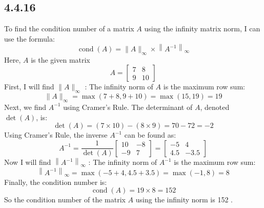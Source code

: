 \documentclass[manuscript,screen,review]{acmart}
\begin{document}
\subsection*{4.4.16}
To find the condition number of a matrix $A$ using the infinity matrix norm, I can use the formula:
$$
\operatorname{cond}(A)=\|A\|_{\infty} \times\left\|A^{-1}\right\|_{\infty}
$$
Here, $A$ is the given matrix
$$
A=\left[\begin{array}{cc}
7 & 8 \\
9 & 10
\end{array}\right]
$$
First, I will find $\|A\|_{\infty}$ :
The infinity norm of $A$ is the maximum row sum:
$$
\|A\|_{\infty}=\max (7+8,9+10)=\max (15,19)=19
$$
Next, we find $A^{-1}$ using Cramer's Rule.
The determinant of $A$, denoted $\operatorname{det}(A)$, is:
$$
\operatorname{det}(A)=(7 \times 10)-(8 \times 9)=70-72=-2
$$
Using Cramer's Rule, the inverse $A^{-1}$ can be found as:
$$
A^{-1}=\frac{1}{\operatorname{det}(A)}\left[\begin{array}{cc}
10 & -8 \\
-9 & 7
\end{array}\right]=\left[\begin{array}{cc}
-5 & 4 \\
4.5 & -3.5
\end{array}\right]
$$
Now I will find $\left\|A^{-1}\right\|_{\infty}$ :
The infinity norm of $A^{-1}$ is the maximum row sum:
$$
\left\|A^{-1}\right\|_{\infty}=\max (-5+4,4.5+3.5)=\max (-1,8)=8
$$
Finally, the condition number is:
$$
\operatorname{cond}(A)=19 \times 8=152
$$
So the condition number of the matrix $A$ using the infinity norm is 152 .
\end{document}
